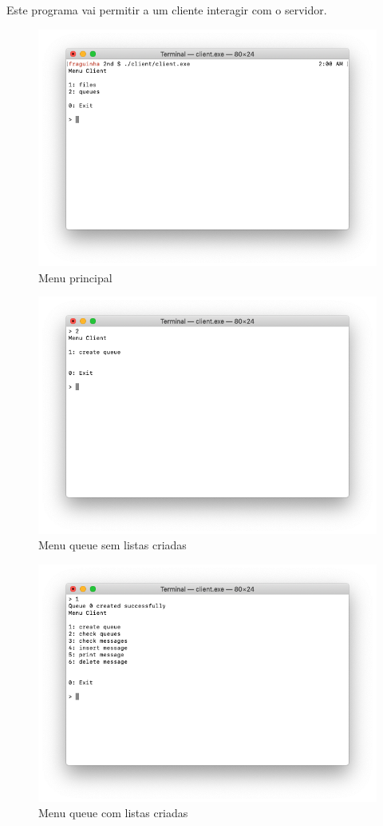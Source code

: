 \documentclass{article}
\begin{document}
Este programa vai permitir a um cliente interagir com o servidor.

\begin{figure}[htbp]
\centering
\includegraphics[width=.9\linewidth]{./img/mainmenu.png}
\caption{\label{fig:estrutura}
Menu principal}
\end{figure}

\begin{figure}[htbp]
\centering
\includegraphics[width=.9\linewidth]{./img/queue1.png}
\caption{\label{fig:queue1}
Menu queue sem listas criadas}
\end{figure}

\begin{figure}[htbp]
\centering
\includegraphics[width=.9\linewidth]{./img/queue2.png}
\caption{\label{fig:queue2}
Menu queue com listas criadas}
\end{figure}
\end{document}
